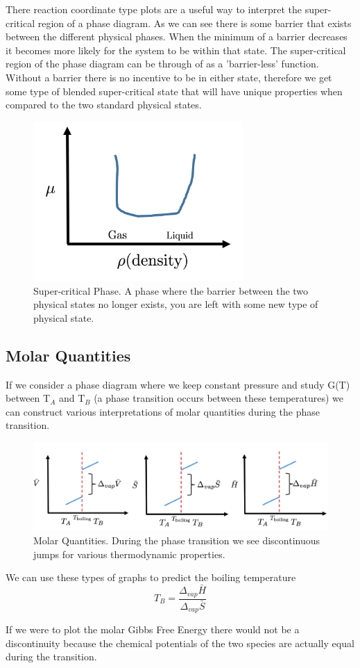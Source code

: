 \documentclass{article}
\begin{document}
There reaction coordinate type plots are a useful way to interpret the super-critical region of a phase diagram.
As we can see there is some barrier that exists between the different physical phases.
When the minimum of a barrier decreases it becomes more likely for the system to be within that state. 
The super-critical region of the phase diagram can be through of as a 'barrier-less' function. 
Without a barrier there is no incentive to be in either state, therefore we get some type of blended super-critical state that will have unique properties when compared to the two standard physical states. 

\begin{figure}[! h]
    \centering
    \includegraphics[width=8cm]{super.png}
    \caption{Super-critical Phase. A phase where the barrier between the two physical states no longer exists, you are left with some new type of physical state.}
    \label{fig:super}
\end{figure}

\subsection*{Molar Quantities}
If we consider a phase diagram where we keep constant pressure and study G(T) between T$_A$ and T$_B$ (a phase transition occurs between these temperatures) we can construct various interpretations of molar quantities during the phase transition. 

\begin{figure}[! h]
    \centering
    \includegraphics[width=17cm]{molar.png}
    \caption{Molar Quantities. During the phase transition we see discontinuous jumps for various thermodynamic properties.}
    \label{fig:molar}
\end{figure}
We can use these types of graphs to predict the boiling temperature
\begin{equation}
    T_B = \frac{\Delta_{vap}\bar{H}}{\Delta_{vap}\bar{S}}
\end{equation}

If we were to plot the molar Gibbs Free Energy there would not be a discontinuity because the chemical potentials of the two species are actually equal during the transition. 
\end{document}
